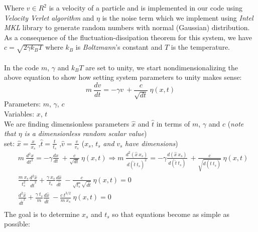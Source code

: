 \documentclass[a4paper,11pt]{article}
\newcommand\tab[1][4mm]{\hspace*{#1}}
\begin{document}
Where \(v \in R^2\) is a velocity of a particle and is implemented in our code using \emph{Velocity Verlet algorithm}\cite{verlet} and \(\eta\) is the noise term which we implement using \emph{Intel MKL}\cite{mkl} library to generate random numbers with normal (Gaussian) distribution. As a consequence of the fluctuation-dissipation theorem for this system, we have \(c = \sqrt{2\gamma k_BT} \) where \(k_B\) is \emph{Boltzmann}'s constant and \(T\) is the temperature. \\\\
In the code \(m\), \(\gamma\) and \(k_BT\) are set to unity, we start nondimensionalizing the above equation to show how setting system parameters to unity makes sense: \\
\begin{equation*}
m\ \frac{dv}{dt} = -\gamma v\ + \frac{c}{\sqrt{dt}}\ \eta(x,t)
\end{equation*}
Parameters: \(m\), \(\gamma\), \(c\) \\
Variables: \(x\), \(t\)\\
We are finding dimensionless parameters \(\hat{x}\) and \(\hat{t}\) in terms of \(m\), \(\gamma\) and \(c\) (\emph{note that \(\eta\) is a dimensionless random scalar value}) \\

set: \(\hat{x} = \frac{x}{x_s}\) \tab,\tab \(\hat{t} = \frac{t}{t_s}\) \tab,\tab \(\hat{v} = \frac{v}{v_s}\) \tab (\small \(x_s\), \(t_s\) \emph{and} \(v_s\) \emph{have dimensions}) \\
\begin{align*}
   &m\ \frac{d^2x}{dt^2} = -\gamma \frac{dx}{dt}\ + \frac{c}{\sqrt{dt}}\ \eta(x,t) \Rightarrow m\ \frac{d^2(\hat{x}\ x_s)}{d(\hat{t}\ t_s)^2} = -\gamma \frac{d(\hat{x}\ x_s)}{d(\hat{t}\ t_s)}\ + \frac{c}{\sqrt{d(\hat{t}\ t_s)}}\ \eta(x,t)
   \\
   &\frac{m\ x_s}{t_s^2} \frac{d^2\hat{x}}{d\hat{t}^2} + \frac{\gamma\ x_s}{t_s} \frac{d\hat{x}}{d\hat{t}}\ - \frac{c}{\sqrt{t_s}\sqrt{d\hat{t}}}\ \eta(x,t) = 0
   \\
   &\frac{d^2\hat{x}}{d\hat{t}^2} + \frac{\gamma\ t_s}{m} \frac{d\hat{x}}{d\hat{t}}\ - \frac{c\ t^{3/2}}{m\ x_s}\ \eta(x,t) = 0
   \\
\end{align*}
The goal is to determine \(x_s\) and \(t_s\) so that equations become as simple as possible: \\

    {} \\
\end{document}

